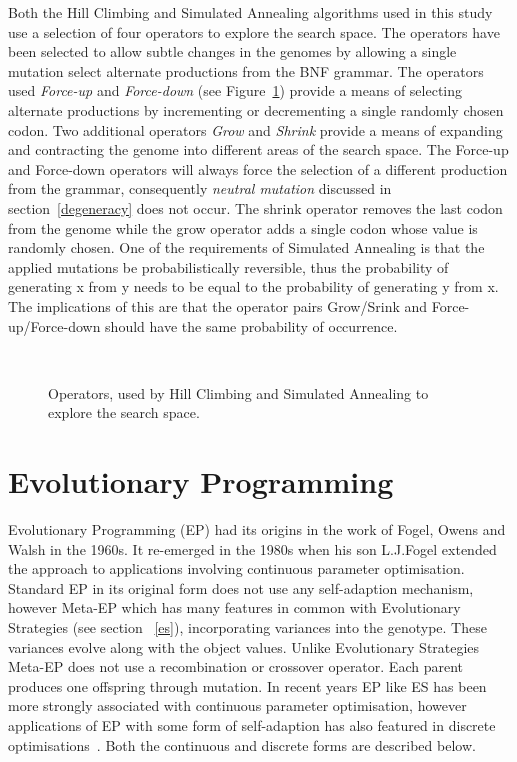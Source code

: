 \par\noindent Both the Hill Climbing and Simulated Annealing algorithms used in this study use a selection of four operators to explore the search space. The operators have been selected to allow subtle changes in the genomes by allowing a single mutation select alternate productions from the BNF grammar. The operators used  \emph{Force-up} and \emph{Force-down} (see Figure~\ref{operators_hcsa}) provide a means of selecting alternate productions by incrementing or decrementing a single randomly chosen codon. Two additional operators \emph{Grow} and \emph{Shrink} provide a means of expanding and contracting the genome into different areas of the search space. The Force-up and Force-down operators will always force the selection of a different production from the grammar, consequently \emph{neutral mutation} discussed in section~\ref{degeneracy} does not occur. The shrink operator removes the last codon from the genome while the grow operator adds a single codon whose value is randomly chosen.
One of the requirements of Simulated Annealing is that the applied mutations be probabilistically reversible, thus the probability of generating x from y needs to be equal to the probability of generating y from x. The implications of this are that the operator pairs Grow/Srink and Force-up/Force-down should have the same probability of occurrence.


\begin{figure}[]
\centerline{\hbox{
}}
\caption{ Operators, used by Hill Climbing and Simulated Annealing to explore the search space.}
\label{operators_hcsa}
\end{figure}

\section{Evolutionary Programming}
\label{ep}Evolutionary Programming (EP) had its origins in the work of Fogel, Owens and Walsh in the 1960s. It re-emerged in the 1980s when his son L.J.Fogel extended the approach to applications involving continuous parameter optimisation. Standard EP in its original form does not use any self-adaption mechanism, however Meta-EP which has many features in common with Evolutionary Strategies (see section ~\ref{es}), incorporating variances into the genotype. 
These variances evolve along with the object values. Unlike Evolutionary Strategies Meta-EP does not use a recombination or crossover operator. Each parent produces one offspring through mutation. In recent years EP like ES has been more strongly associated with continuous parameter optimisation, however applications of EP with some form of self-adaption has also featured in discrete optimisations~\cite{fogel}. Both the continuous and discrete forms are described  below.


